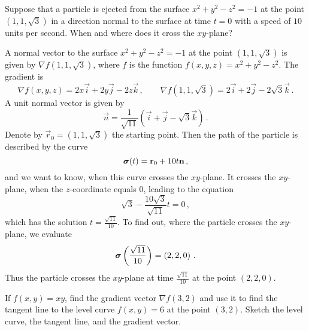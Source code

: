 \begin{question}
Suppose that a particle is ejected from the surface $x^2 + y^2 - z^2 = -1$ at the point $\left(1, 1, \sqrt{3}\right)$ in a direction normal to the surface at time $t=0$ with a speed of $10$ units per second. When and where does it cross the $xy$-plane?
\end{question}

\begin{solution}
A normal vector to the surface $x^2+y^2-z^2 = -1$ at the point $\left(1, 1, \sqrt{3}\right)$ is given by $\nabla f\left(1, 1, \sqrt 3\right)$, where $f$ is the function $f(x,y,z) = x^2+y^2-z^2$. The gradient is
\[
\nabla f(x,y,z) = 2x \vec i + 2y \vec j -2z \vec k\,,
\qquad
\nabla f\left(1, 1, \sqrt 3 \right) = 2\vec i + 2 \vec j -2\sqrt{3} \vec k \,.
\]
A unit normal vector is given by
\[
\vec n = \frac{1}{\sqrt{11}}\left( \vec i +  \vec j - \sqrt{3} \vec k \right) \,.
\]
Denote by $\vec r_0 = \left(1, 1, \sqrt 3\right)$ the starting point. Then the path of the particle is described by the curve
\[
\bm{\mathrm{\sigma}}(t) = \bm{\mathrm{r}}_0 + 10 t \bm{\mathrm{n}}\,,
\]
and we want to know, when this curve crosses the $xy$-plane. It crosses the $xy$-plane, when the $z$-coordinate equals $0$, leading to the equation
\[
\sqrt{3} - \frac{10 \sqrt{3}}{\sqrt{11}} t = 0\,,
\]
which has the solution $t = \displaystyle\frac{\sqrt{11}}{10}$. To find out, where the particle crosses the $xy$-plane, we evaluate
\[
\bm{\mathrm{\sigma}}\left(\frac{\sqrt{11}}{10}\right) = \left(2, 2, 0 \right)\,.
\]
Thus the particle crosses the $xy$-plane at time $\displaystyle\frac{\sqrt{11}}{10}$ at the point $(2,2,0)$.
\end{solution}

\begin{question}
If $f(x,y) = xy$, find the gradient vector $\nabla f(3,2)$ and use it to find the tangent line to the level curve $f(x,y) = 6$ at the point $(3,2)$. Sketch the level curve, the tangent line, and the gradient vector.
\end{question}

